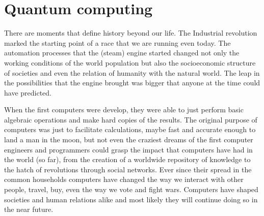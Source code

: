 \chapter{Quantum computing}
%
%
%

There are moments that define history beyond our life. The Industrial revolution marked the starting point of a race that we are running even today. The automation processes that the (steam) engine started changed not only the working conditions of the world population but also the socioeconomic structure of societies and even the relation of humanity with the natural world. %
The leap in the possibilities that the engine brought was bigger that anyone at the time could have predicted.

When the first computers were develop, they were able to just perform basic algebraic operations and make hard copies of the results. %
The original purpose of computers was just to facilitate calculations, maybe fast and accurate enough to land a man in the moon, but not even the craziest dreams of the first computer engineers and programmers could grasp the impact that computers have had in the world (so far), from the creation of a worldwide repository of knowledge\cite{Stallman2000} to the hatch of revolutions through social networks\cite{Alhindi2012}. Ever since their spread in the common households computers have changed the way we interact with other people, travel, buy, even the way we vote and fight wars.
Computers have shaped societies and human relations alike and most likely they will continue doing so in the near future.

